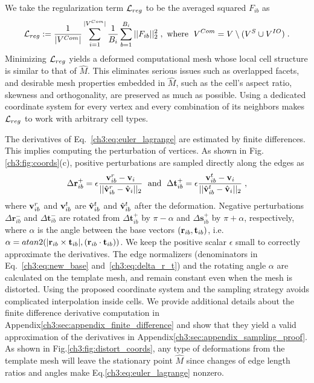We take the regularization term $\mathcal{L}_{reg}$ to be the averaged squared $F_{ib}$ as 
%
\begin{equation}
    \mathcal{L}_{reg} := \frac{1}{|V^{Com}|} \sum_{i=1}^{|V^{Com}|} \frac{1}{B_i} \sum_{b=1}^{B_i} ||F_{ib}||_2^2\; ,\text{ where }\; V^{Com}=V \setminus  ({V^S \cup V^{IO}})\;.
    \label{ch3:eq:l_reg}
\end{equation}
%
Minimizing $\mathcal{L}_{reg}$ yields a deformed computational mesh whose local cell structure is similar to that of $\hat{M}$. This eliminates serious issues such as overlapped facets, and desirable mesh properties embedded in $\hat{M}$, such as the cell's aspect ratio, skewness and orthogonality, are preserved as much as possible.
Using a dedicated coordinate system for every vertex and every combination of its neighbors makes $\mathcal{L}_{reg}$ to work with arbitrary cell types.



The derivatives of Eq.~\ref{ch3:eq:euler_lagrange} are estimated by finite differences. This implies computing the perturbation of vertices. As shown in Fig.\ref{ch3:fig:coords}(c), positive perturbations are sampled directly along the edges as
%
\begin{equation}
    \Delta \textbf{r}_{ib}^+ = \epsilon \frac{{{\mathbf{v}_{ib}^r} - {\mathbf{v}_i}}}{{||{\hat{\mathbf{v}}_{ib}^r} - {\hat{\mathbf{v}}_i}|{|_2}}} \;
    \text{ and } \;
    \Delta \textbf{t}_{ib}^+ = \epsilon \frac{{{\mathbf{v}_{ib}^t} - {\mathbf{v}_i}}}{{||{\hat{\mathbf{v}}_{ib}^t} - {\hat{\mathbf{v}}_i}|{|_2}}} \;,
    \label{ch3:eq:delta_r_t}
\end{equation}
%
where $\mathbf{v}_{ib}^r$ and $\mathbf{v}_{ib}^t$ are $\hat{\mathbf{v}}_{ib}^t$ and $\hat{\mathbf{v}}_{ib}^t$ after the deformation. Negative perturbations $\Delta \textbf{r}_{ib}^-$ and $\Delta \textbf{t}_{ib}^-$ are rotated from $\Delta \textbf{t}_{ib}^+$  by $\pi-\alpha$ and $\Delta \textbf{s}_{ib}^+$ by $\pi+\alpha$, respectively, where $\alpha$ is the angle between the base vectors $(\mathbf{r}_{ib}, \mathbf{t}_{ib})$, i.e. $\alpha=\mathop{atan2}(|\mathbf{r}_{ib} \times \mathbf{t}_{ib}| , (\mathbf{r}_{ib}\cdot \mathbf{t}_{ib}))$. We keep the positive scalar $\epsilon$ small to correctly approximate the derivatives. The edge normalizers (denominators in Eq.~\ref{ch3:eq:new_base} and~\ref{ch3:eq:delta_r_t}) and the rotating angle $\alpha$ are calculated on the template mesh, and remain constant even when the mesh is distorted. 
Using the proposed coordinate system and the sampling strategy avoids complicated interpolation inside cells.
We provide additional details about the finite difference derivative  computation in Appendix\ref{ch3:sec:appendix_finite_difference} and show that they yield a valid approximation of the derivatives
in Appendix\ref{ch3:sec:appendix_sampling_proof}.
As shown in Fig.\ref{ch3:fig:distort_coords}, any type of deformations from the template mesh will leave the stationary point $\hat{M}$ since changes of edge length ratios and angles make Eq.\ref{ch3:eq:euler_lagrange} nonzero.

